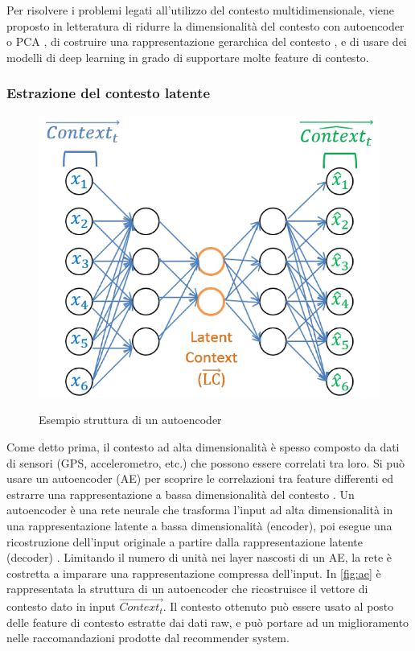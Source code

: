 Per risolvere i problemi legati all'utilizzo del contesto multidimensionale, viene proposto in letteratura di ridurre la dimensionalità del contesto con autoencoder o PCA \cite{latent-context} \cite{context-autoencoder}, di costruire una rappresentazione gerarchica del contesto \cite{hierarchical-context}, e di usare dei modelli di deep learning in grado di supportare molte feature di contesto\cite{context-aware-deep-learning}.

\subsubsection{Estrazione del contesto latente} 
\label{ssec:latent-context}
\begin{figure}
 \centering
  \includegraphics[scale=0.65]{immagini/autoencoder.png}
  \caption{Esempio struttura di un autoencoder}
  \cite{hierarchical-context}
  \label{fig:ae}
\end{figure}

Come detto prima, il contesto ad alta dimensionalità è spesso composto da dati di sensori (GPS, accelerometro, etc.) che possono essere correlati tra loro. Si può usare un autoencoder (AE) per scoprire le correlazioni tra feature differenti ed estrarre una rappresentazione a bassa dimensionalità del contesto \cite{latent-context}. Un autoencoder è una rete neurale che trasforma l'input ad alta dimensionalità in una rappresentazione latente a bassa dimensionalità (encoder), poi esegue una ricostruzione dell'input originale a partire dalla rappresentazione latente (decoder) \cite{autoencoder}. Limitando il numero di unità nei layer nascosti di un AE, la rete è costretta a imparare una rappresentazione compressa dell'input. In \autoref{fig:ae} è rappresentata la struttura di un autoencoder che ricostruisce il vettore di contesto dato in input $\overrightarrow{Context_t}$. Il contesto ottenuto può essere usato al posto delle feature di contesto estratte dai dati raw, e può portare ad un miglioramento nelle raccomandazioni prodotte dal recommender system.

